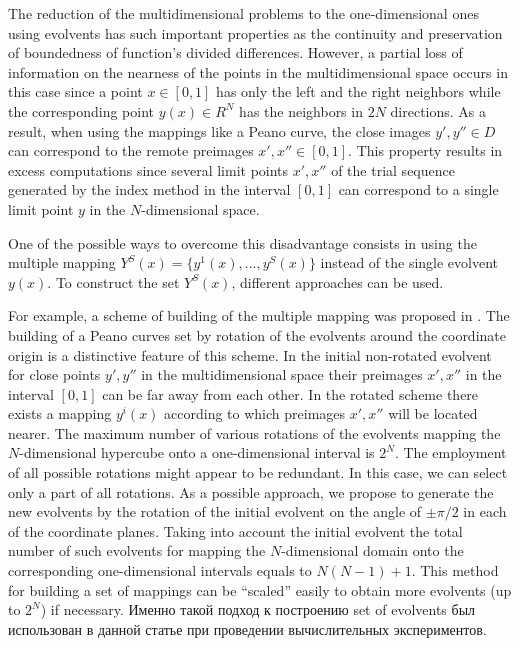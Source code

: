 \documentclass[smallextended]{svjour3}       %
\begin{document}
The reduction of the multidimensional problems to the one-dimensional ones using evolvents has such important properties as the continuity and preservation of boundedness of function's divided differences. However, a partial loss of information on the nearness of the points in the multidimensional space occurs in this case since a point $x \in [0,1]$ has only the left and the right neighbors while the corresponding point $y(x) \in R^N$ has the neighbors in $2N$ directions. As a result, when using the mappings like a Peano curve, the close images $y', y'' \in D$ can correspond to the remote preimages $x', x'' \in [0,1]$. This property results in excess computations since several limit points $x', x''$ of the trial sequence generated by the index method in the interval $[0,1]$ can correspond to a single limit point $y$ in the $N$-dimensional space.

One of the possible ways to overcome this disadvantage consists in using the multiple mapping $Y^S(x)=\{ y^1 (x),...,y^S(x)\}$ instead of the single evolvent $y(x)$. To construct the set $Y^S(x)$, different approaches can be used. 

For example, a scheme of building of the multiple mapping was proposed  in \cite{6_Gergel2009}. The building of a Peano curves set by rotation of the evolvents around the coordinate origin is a distinctive feature of this scheme. In the initial non-rotated evolvent for close points $y', y''$ in the multidimensional space their preimages  $x', x''$ in the interval $[0,1]$ can be far away from each other. In the rotated scheme there exists a mapping $y^i(x)$ according to which preimages $x', x''$ will be located nearer. The maximum number of various rotations of the evolvents mapping the $N$-dimensional hypercube onto a one-dimensional interval is $2^N$. The employment of all possible rotations might appear to be redundant. In this case, we can select only a part of all rotations. As a possible approach, we propose to generate the new evolvents by the rotation of the initial evolvent on the angle of $\pm\pi/2$ in each of the coordinate planes. Taking into account the initial evolvent the total number of such evolvents for mapping the $N$-dimensional domain onto the corresponding one-dimensional intervals equals to $N(N-1)+1$. This method for building a set of mappings can be ``scaled'' easily to obtain more evolvents (up to $2^N$) if necessary.
\Russian
Именно такой подход к построению set of evolvents был использован в данной статье при проведении вычислительных экспериментов. 
\end{document}
